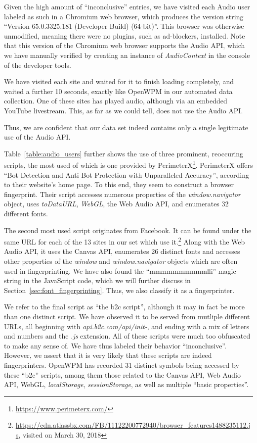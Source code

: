 \documentclass[
    fontsize=12pt,
    headings=small,
    parskip=half,
    bibliography=totoc,
    numbers=noenddot,
    open=any
    ]{scrreprt}
\begin{document}
Given the high amount of ``inconclusive'' entries, we have visited each Audio user labeled as such
in a Chromium web browser, which produces the version string ``Version 65.0.3325.181 (Developer Build) (64-bit)''.
This browser was otherwise unmodified, meaning there were no plugins, such as ad-blockers, installed.
Note that this version of the Chromium web browser supports the Audio API, which we have manually verified
by creating an instance of \textit{AudioContext} in the console of the developer tools.

We have visited each site and waited for it to finish loading completely, and waited a further 10 seconds,
exactly like OpenWPM in our automated data collection.
One of these sites has played audio, although via an embedded YouTube livestream.
This, as far as we could tell, does not use the Audio API.

Thus, we are confident that our data set indeed contains only a single legitimate use of
the Audio API.

Table~\ref{table:audio_users} further shows the use of three prominent, reoccuring scripts, the most used
of which is one provided by PerimeterX\footnote{\url{https://www.perimeterx.com/}}.
PerimeterX offers ``Bot Detection and Anti Bot Protection with Unparalleled Accuracy'',
according to their website's home page. To this end, they seem to construct a browser fingerprint.
Their script accesses numerous properties of the \textit{window.navigator} object, uses \textit{toDataURL},
\textit{WebGL}, the Web Audio API, and enumerates 32 different fonts.

The second most used script originates from Facebook. It can be found under the same URL
for each of the 13 sites in our set which use it.\footnote{\url{https://cdn.atlassbx.com/FB/11122200772940/browser_features1488235112.js}, visited on March 30, 2018}
Along with the Web Audio API, it uses the Canvas API, enumerates 26 distinct fonts and accesses other
properties of the \textit{window} and \textit{window.navigator} objects which are often used in fingerprinting.
We have also found the ``mmmmmmmmmmlli'' magic string in the JavaScript code, which we will further discuss
in Section~\ref{sec:font_fingerprinting}.
Thus, we also classify it as a fingerprinter.

We refer to the final script as ``the b2c script'', although it may in fact be more than one distinct
script. We have observed it to be served from mutliple different URLs,
all beginning with \textit{api.b2c.com/api/init-}, and ending with a mix of letters and numbers and the \textit{.js} extension.
All of these scripts were much too obfuscated to make any sense of. We have thus labeled their behavior ``inconclusive''.
However, we assert that it is very likely that these scripts are indeed fingerprinters.
OpenWPM has recorded 31 distinct symbols being accessed by these ``b2c'' scripts, among them
those related to the Canvas API, Web Audio API, WebGL, \textit{localStorage}, \textit{sessionStorage},
as well as multiple ``basic properties''.
\end{document}
